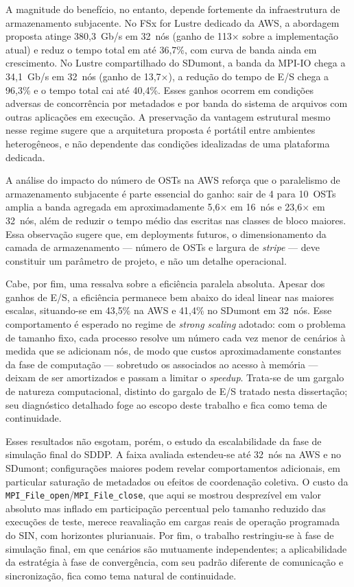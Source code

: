 A magnitude do benefício, no entanto, depende fortemente da
infraestrutura de armazenamento subjacente. No FSx for Lustre
dedicado da AWS, a abordagem proposta atinge 380{,}3~Gb/s em 32~nós
(ganho de 113$\times$ sobre a implementação atual) e reduz o tempo
total em até 36{,}7\%, com curva de banda ainda em crescimento. No
Lustre compartilhado do SDumont, a banda da MPI-IO chega a
34{,}1~Gb/s em 32~nós (ganho de 13{,}7$\times$), a redução do tempo
de E/S chega a 96{,}3\% e o tempo total cai até 40{,}4\%. Esses ganhos
ocorrem em condições adversas de concorrência por metadados e por
banda do sistema de arquivos com outras aplicações em execução. A
preservação da vantagem estrutural mesmo nesse regime sugere que a
arquitetura proposta é portátil entre ambientes heterogêneos, e não
dependente das condições idealizadas de uma plataforma dedicada.

A análise do impacto do número de OSTs na AWS reforça que o
paralelismo de armazenamento subjacente é parte essencial do ganho:
sair de 4 para 10~OSTs amplia a banda agregada em aproximadamente
5{,}6$\times$ em 16~nós e 23{,}6$\times$ em 32~nós, além de reduzir o
tempo médio das escritas nas classes de bloco maiores. Essa observação
sugere que, em deployments futuros, o dimensionamento da camada de
armazenamento --- número de OSTs e largura de \textit{stripe} ---
deve constituir um parâmetro de projeto, e não um detalhe
operacional.

Cabe, por fim, uma ressalva sobre a eficiência paralela absoluta.
Apesar dos ganhos de E/S, a eficiência permanece bem abaixo do ideal
linear nas maiores escalas, situando-se em 43{,}5\% na AWS e 41{,}4\%
no SDumont em 32~nós. Esse comportamento é esperado no regime de
\textit{strong scaling} adotado: com o problema de tamanho fixo, cada
processo resolve um número cada vez menor de cenários à medida que se
adicionam nós, de modo que custos aproximadamente constantes da fase
de computação --- sobretudo os associados ao acesso à memória ---
deixam de ser amortizados e passam a limitar o \textit{speedup}. Trata-se
de um gargalo de natureza computacional, distinto do gargalo de E/S
tratado nesta dissertação; seu diagnóstico detalhado foge ao escopo
deste trabalho e fica como tema de continuidade.

Esses resultados não esgotam, porém, o estudo da escalabilidade da
fase de simulação final do SDDP. A faixa avaliada estendeu-se até
32~nós na AWS e no SDumont; configurações maiores podem revelar
comportamentos adicionais, em particular saturação de metadados ou
efeitos de coordenação coletiva. O custo da
\texttt{MPI\_File\_open}/\texttt{MPI\_File\_close}, que aqui se mostrou desprezível em valor
absoluto mas inflado em participação percentual pelo tamanho
reduzido das execuções de teste, merece reavaliação em cargas reais
de operação programada do SIN, com horizontes plurianuais. Por fim,
o trabalho restringiu-se à fase de simulação final, em que cenários
são mutuamente independentes; a aplicabilidade da estratégia à fase
de convergência, com seu padrão diferente de comunicação e
sincronização, fica como tema natural de continuidade.

